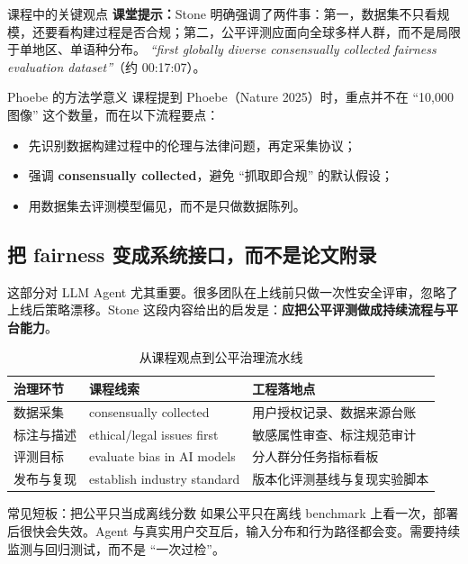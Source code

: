 \documentclass[a4paper]{article}
\begin{document}
\begin{importantbox}{课程中的关键观点}
\textbf{课堂提示：}Stone 明确强调了两件事：第一，数据集不只看规模，还要看构建过程是否合规；第二，公平评测应面向全球多样人群，而不是局限于单地区、单语种分布。
\textit{``first globally diverse consensually collected fairness evaluation dataset''}（约 00:17:07）。
\end{importantbox}

\begin{knowledgebox}{Phoebe 的方法学意义}
课程提到 Phoebe（Nature 2025）时，重点并不在 ``10,000 图像'' 这个数量，而在以下流程要点：
\begin{itemize}
    \item 先识别数据构建过程中的伦理与法律问题，再定采集协议；
    \item 强调 \textbf{consensually collected}，避免 ``抓取即合规'' 的默认假设；
    \item 用数据集去评测模型偏见，而不是只做数据陈列。
\end{itemize}
\end{knowledgebox}

\subsection{把 fairness 变成系统接口，而不是论文附录}
这部分对 LLM Agent 尤其重要。很多团队在上线前只做一次性安全评审，忽略了上线后策略漂移。Stone 这段内容给出的启发是：\textbf{应把公平评测做成持续流程与平台能力}。

\begin{table}[H]
\centering
\begin{tabular}{p{3.2cm}p{4.6cm}p{4.2cm}}
\toprule
\textbf{治理环节} & \textbf{课程线索} & \textbf{工程落地点} \\
\midrule
数据采集 & consensually collected & 用户授权记录、数据来源台账 \\
标注与描述 & ethical/legal issues first & 敏感属性审查、标注规范审计 \\
评测目标 & evaluate bias in AI models & 分人群分任务指标看板 \\
发布与复现 & establish industry standard & 版本化评测基线与复现实验脚本 \\
\bottomrule
\end{tabular}
\caption{从课程观点到公平治理流水线}
\end{table}

\begin{warningbox}{常见短板：把公平只当成离线分数}
如果公平只在离线 benchmark 上看一次，部署后很快会失效。Agent 与真实用户交互后，输入分布和行为路径都会变。需要持续监测与回归测试，而不是 ``一次过检''。
\end{warningbox}
\end{document}
